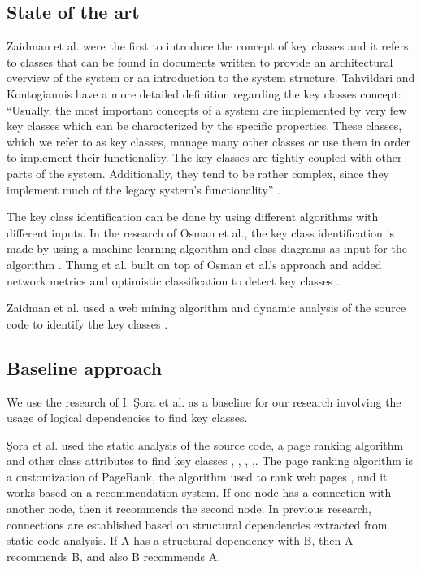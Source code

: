 \documentclass[runningheads]{comsis2}
\begin{document}
\subsection{State of the art}

Zaidman et al. \cite{ZaidmanJurnal} were the first to introduce the concept of key classes and it refers to classes that can be found in documents written to provide an architectural overview of the system or an introduction to the system structure.
Tahvildari and Kontogiannis have a more detailed definition regarding the key classes concept: “Usually, the most important concepts of a system are implemented by very few key classes which can be characterized by the specific properties. These classes, which we refer to as key classes, manage many other classes or use them in order to implement their functionality. The key classes are tightly coupled with other parts of the system. Additionally, they tend to be rather complex, since they implement much of the legacy system’s functionality” \cite{Tahvildari2004ImprovingDQ}.


The key class identification can be done by using different algorithms with different inputs. In the research of Osman et al., the key class identification is made by using a machine learning algorithm and class diagrams as input for the algorithm \cite{6676885}. Thung et al. built on top of Osman et al.’s approach and added network metrics and optimistic classification to detect key classes \cite{rocclasification}.

Zaidman et al. used a web mining algorithm and dynamic analysis of the source code to identify the key classes \cite{ZaidmanJurnal}.

\subsection{Baseline approach}
We use the research of I. Şora et al. \cite{Finding-key-classes} as a baseline for our research involving the usage of logical dependencies to find key classes. 

Şora et al. used the static analysis of the source code, a page ranking algorithm and other class attributes to find key classes \cite{PagerankENASE}, \cite{enase15}, \cite{SoraSpringer}, \cite{PagerankSACI},\cite{Finding-key-classes}.
The page ranking algorithm is a customization of PageRank, the algorithm used to rank web pages \cite{ilprints422}, and it works based on a recommendation system. If one node has a connection with another node, then it recommends the second node. In previous research, connections are established based on structural dependencies extracted from static code analysis. If A has a structural dependency with B, then A recommends B, and also B recommends A.
\end{document}
